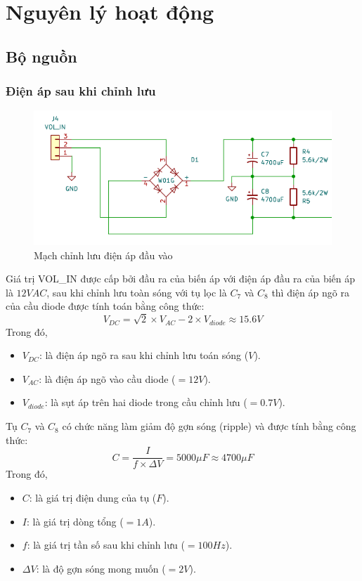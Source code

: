 \chapter{Nguyên lý hoạt động}
\newpage
\fontsize{13}{14}\selectfont
\section{Bộ nguồn}
\subsection{Điện áp sau khi chỉnh lưu}

\begin{figure}[H]
	\centering
	\includegraphics[width=0.6\linewidth]{./picture/mach_chinh_luu.pdf}
	\caption{Mạch chỉnh lưu điện áp đầu vào}
	\label{f_mach chinh luu}
\end{figure}

Giá trị VOL\_IN được cấp bởi đầu ra của biến áp với điện áp đầu ra của biến áp là $12VAC$, sau khi chỉnh lưu toàn sóng với tụ lọc là $C_7$ và $C_8$ thì điện áp ngõ ra của cầu diode được tính toán bằng công thức: \[V_{DC} = \sqrt{2}\times V_{AC} - 2\times V_{diode} \approx 15.6V\]
Trong đó, 
\begin{itemize}[label=-]
	\item $V_{DC}$: là điện áp ngõ ra sau khi chỉnh lưu toán sóng ($V$).
	\item $V_{AC}$: là điện áp ngõ vào cầu diode ($=12V$).
	\item $V_{diode}$: là sụt áp trên hai diode trong cầu chỉnh lưu ($=0.7V$).
\end{itemize}

Tụ $C_{7}$ và $C_{8}$ có chức năng làm giảm độ gợn sóng (ripple) và được tính bằng công thức: \[C = \dfrac{I}{f \times \Delta V} = 5000\mu F \approx 4700\mu F\]
Trong đó,
\begin{itemize}[label = -]
	\item $C$: là giá trị điện dung của tụ ($F$).
	\item $I$: là giá trị dòng tổng ($=1A$).
	\item $f$: là giá trị tần số sau khi chỉnh lưu ($=100Hz$).
	\item $\Delta V$: là độ gợn sóng mong muốn ($=2V$).
\end{itemize}

